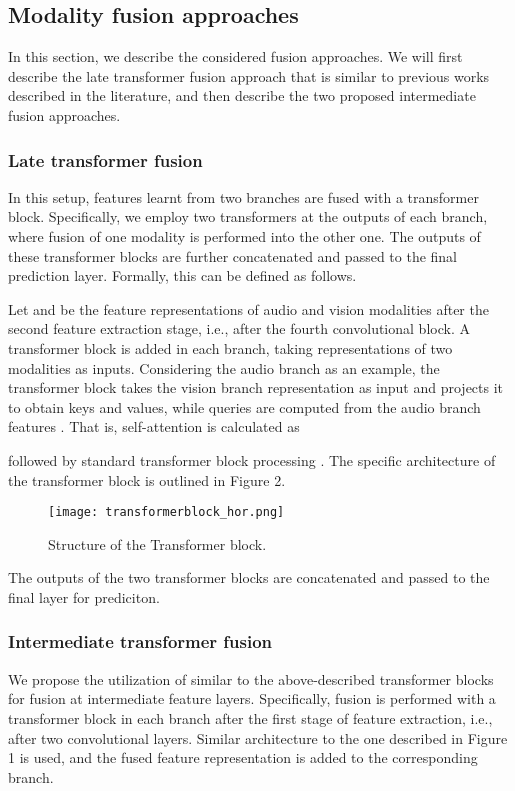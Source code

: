 \documentclass[a4paper,conference]{IEEEtran}
\begin{document}
\subsection{Modality fusion approaches}

In this section, we describe the considered fusion approaches. We will first describe the late transformer fusion approach that is similar to previous works described in the literature, and then describe the two proposed intermediate fusion approaches. 

\subsubsection{Late transformer fusion}

In this setup, features learnt from two branches are fused with a transformer block. Specifically, we employ two transformers at the outputs of each branch, where fusion of one modality is performed into the other one. The outputs of these transformer blocks are further concatenated and passed to the final prediction layer. Formally, this can be defined as follows.

Let  and  be the feature representations of audio and vision modalities after the second feature extraction stage, i.e., after the fourth convolutional block. A transformer block is added in each branch, taking representations of two modalities as inputs. Considering the audio branch as an example, the transformer block takes the vision branch representation  as input and projects it to obtain keys and values, while queries are computed from the audio branch features . That is, self-attention is calculated as

followed by standard transformer block processing \cite{vaswani}. The specific architecture of the transformer block is outlined in Figure 2.

\begin{figure}[h]
\centering
\texttt{[image: transformerblock\_hor.png]}
\caption{Structure of the Transformer block.}
\end{figure}

The outputs of the two transformer blocks are concatenated and passed to the final layer for prediciton.


\subsubsection{Intermediate transformer fusion}

We propose the utilization of similar to the above-described transformer blocks for fusion at intermediate feature layers. Specifically, fusion is performed with a transformer block in each branch after the first stage of feature extraction, i.e., after two convolutional layers. Similar architecture to the one described in Figure 1 is used, and the fused feature representation is added to the corresponding branch.
\end{document}
